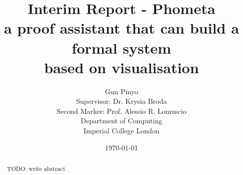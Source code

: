 \documentclass[11pt, a4paper]{report}
\title{
    Interim Report - Phometa \\
    a proof assistant that can build a formal system \\
    based on visualisation
}
\author{
    Gun Pinyo \\
    Supervisor: Dr. Krysia Broda\\
    Second Marker: Prof. Alessio R. Lomuscio\\
    Department of Computing \\
    Imperial College London
}
\date{\today}
\begin{document}
\maketitle
\thispagestyle{empty}

\begin{abstract}
TODO: write abstract
\end{abstract}

\tableofcontents









\printbibliography
\end{document}
